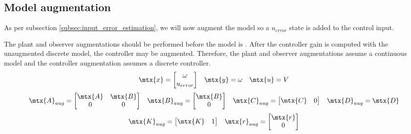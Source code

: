 \subsection{Model augmentation}

As per subsection \ref{subsec:input_error_estimation}, we will now augment the
\gls{model} so a $u_{error}$ state is added to the \gls{control input}.

The \gls{plant} and \gls{observer} augmentations should be performed before the
\gls{model} is . After the \gls{controller}
gain is computed with the unaugmented discrete \gls{model}, the controller may
be augmented. Therefore, the \gls{plant} and \gls{observer} augmentations assume
a continuous \gls{model} and the \gls{controller} augmentation assumes a
discrete \gls{controller}.
\begin{equation*}
  \begin{array}{ccc}
    \mtx{x} =
    \begin{bmatrix}
      \omega \\
      u_{error}
    \end{bmatrix} &
    \mtx{y} = \omega &
    \mtx{u} = V
  \end{array}
\end{equation*}
\begin{equation}
  \begin{array}{cccc}
    \mtx{A}_{aug} =
    \begin{bmatrix}
      \mtx{A} & \mtx{B} \\
      0 & 0
    \end{bmatrix} &
    \mtx{B}_{aug} =
    \begin{bmatrix}
      \mtx{B} \\
      0
    \end{bmatrix} &
    \mtx{C}_{aug} = \begin{bmatrix}
      \mtx{C} & 0
    \end{bmatrix} &
    \mtx{D}_{aug} = \mtx{D}
  \end{array}
\end{equation}
\begin{equation}
  \begin{array}{cc}
    \mtx{K}_{aug} = \begin{bmatrix}
      \mtx{K} & 1
    \end{bmatrix} &
    \mtx{r}_{aug} = \begin{bmatrix}
      \mtx{r} \\
      0
    \end{bmatrix}
  \end{array}
\end{equation}

